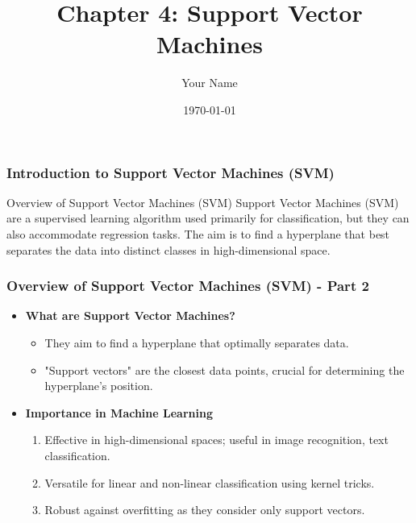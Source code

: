 \documentclass{beamer}
\title{Chapter 4: Support Vector Machines}
\author{Your Name}
\institute{Your Institution}
\date{\today}
\begin{document}
\frame{\titlepage}

\begin{frame}[fragile]
    \frametitle{Introduction to Support Vector Machines (SVM)}
    \begin{block}{Overview of Support Vector Machines (SVM)}
        Support Vector Machines (SVM) are a supervised learning algorithm used primarily for classification, but they can also accommodate regression tasks. The aim is to find a hyperplane that best separates the data into distinct classes in high-dimensional space. 
    \end{block}
\end{frame}

\begin{frame}[fragile]
    \frametitle{Overview of Support Vector Machines (SVM) - Part 2}
    \begin{itemize}
        \item \textbf{What are Support Vector Machines?}
            \begin{itemize}
                \item They aim to find a hyperplane that optimally separates data.
                \item "Support vectors" are the closest data points, crucial for determining the hyperplane's position.
            \end{itemize}
        
        \item \textbf{Importance in Machine Learning}
            \begin{enumerate}
                \item Effective in high-dimensional spaces; useful in image recognition, text classification.
                \item Versatile for linear and non-linear classification using kernel tricks.
                \item Robust against overfitting as they consider only support vectors.
            \end{enumerate}
    \end{itemize}
\end{frame}
\end{document}
